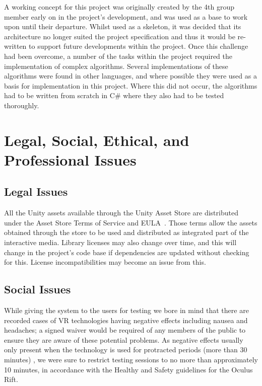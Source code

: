         A working concept for this project was originally created by the 4th group member early on in the project's development, and was used as a base to work upon until their departure. Whilst used as a skeleton, it was decided that its architecture no longer suited the project specification and thus it would be re-written to support future developments within the project. Once this challenge had been overcome, a number of the tasks within the project required the implementation of complex algorithms. Several implementations of these algorithms were found in other languages, and where possible they were used as a basis for implementation in this project. Where this did not occur, the algorithms had to be written from scratch in C\# where they also had to be tested thoroughly.

\section{Legal, Social, Ethical, and Professional Issues}

    \subsection{Legal Issues}
    \label{sec:legal}
        All the Unity assets available through the Unity Asset Store are distributed under the Asset Store Terms of Service and EULA~\cite{unity:terms}. Those terms allow the assets obtained through the store to be used and distributed as integrated part of the interactive media. Library licenses may also change over time, and this will change in the project's code base if dependencies are updated without checking for this. License incompatibilities may become an issue from this.
        
    \subsection{Social Issues}
        While giving the system to the users for testing we bore in mind that there are recorded cases of VR technologies having negative effects including nausea and headaches; a signed waiver would be required of any members of the public to ensure they are aware of these potential problems. As negative effects usually only present when the technology is used for protracted periods (more than 30 minutes) \cite{occulus_health_and_safety}, we were sure to restrict testing sessions to no more than approximately 10 minutes, in accordance with the Healthy and Safety guidelines for the Oculus Rift.
    
